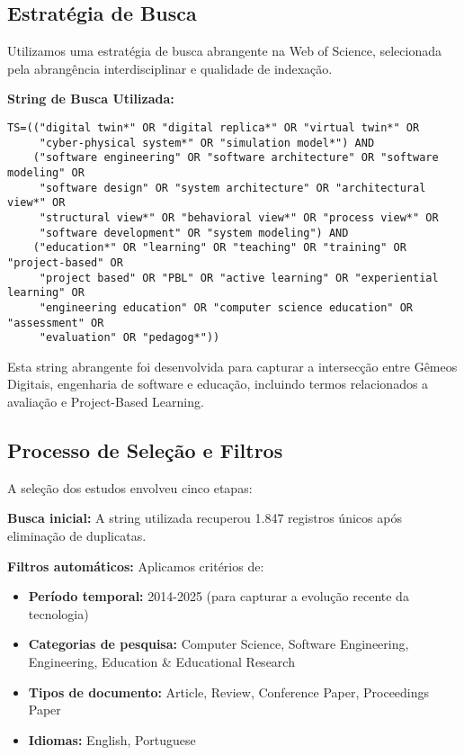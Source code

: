 \documentclass[english, spanish, brazilian]{RBIEarticle} %
\begin{document}
\subsection{Estratégia de Busca}

Utilizamos uma estratégia de busca abrangente na Web of Science, selecionada pela abrangência interdisciplinar e qualidade de indexação.

\textbf{String de Busca Utilizada:}
\begin{verbatim}
TS=(("digital twin*" OR "digital replica*" OR "virtual twin*" OR 
     "cyber-physical system*" OR "simulation model*") AND 
    ("software engineering" OR "software architecture" OR "software modeling" OR 
     "software design" OR "system architecture" OR "architectural view*" OR 
     "structural view*" OR "behavioral view*" OR "process view*" OR 
     "software development" OR "system modeling") AND 
    ("education*" OR "learning" OR "teaching" OR "training" OR "project-based" OR 
     "project based" OR "PBL" OR "active learning" OR "experiential learning" OR 
     "engineering education" OR "computer science education" OR "assessment" OR 
     "evaluation" OR "pedagog*"))
\end{verbatim}

Esta string abrangente foi desenvolvida para capturar a intersecção entre Gêmeos Digitais, engenharia de software e educação, incluindo termos relacionados a avaliação e Project-Based Learning.

\subsection{Processo de Seleção e Filtros}

A seleção dos estudos envolveu cinco etapas:

\textbf{Busca inicial:} A string utilizada recuperou 1.847 registros únicos após eliminação de duplicatas.

\textbf{Filtros automáticos:} Aplicamos critérios de:
\begin{itemize}
    \item \textbf{Período temporal:} 2014-2025 (para capturar a evolução recente da tecnologia)
    \item \textbf{Categorias de pesquisa:} Computer Science, Software Engineering, Engineering, Education \& Educational Research
    \item \textbf{Tipos de documento:} Article, Review, Conference Paper, Proceedings Paper
    \item \textbf{Idiomas:} English, Portuguese
\end{itemize}
\end{document}
